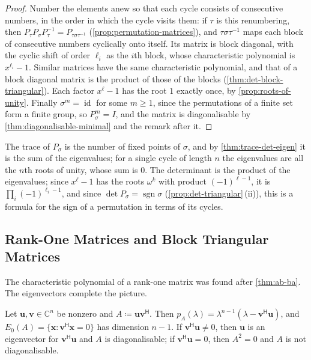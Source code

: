 \begin{proof}
Number the elements anew so that each cycle consists of consecutive numbers, in the order in which the cycle visits them: if $\tau$ is this renumbering, then $P_\tau P_\sigma P_\tau^{-1}=P_{\tau\sigma\tau^{-1}}$ (\cref{prop:permutation-matrices}), and $\tau\sigma\tau^{-1}$ maps each block of consecutive numbers cyclically onto itself. Its matrix is block diagonal, with the cyclic shift of order $\ell_i$ as the $i$th block, whose characteristic polynomial is $x^{\ell_i}-1$. Similar matrices have the same characteristic polynomial, and that of a block diagonal matrix is the product of those of the blocks (\cref{thm:det-block-triangular}). Each factor $x^{\ell}-1$ has the root $1$ exactly once, by \cref{prop:roots-of-unity}. Finally $\sigma^m=\operatorname{id}$ for some $m\ge1$, since the permutations of a finite set form a finite group, so $P_\sigma^m=I$, and the matrix is diagonalisable by \cref{thm:diagonalisable-minimal} and the remark after it.
\end{proof}

The trace of $P_\sigma$ is the number of fixed points of $\sigma$, and by \cref{thm:trace-det-eigen} it is the sum of the eigenvalues; for a single cycle of length $n$ the eigenvalues are all the $n$th roots of unity, whose sum is $0$. The determinant is the product of the eigenvalues; since $x^\ell-1$ has the roots $\omega^k$ with product $(-1)^{\ell-1}$, it is $\prod_i(-1)^{\ell_i-1}$, and since $\det P_\sigma=\operatorname{sgn}\sigma$ (\cref{prop:det-triangular}\,(ii)), this is a formula for the sign of a permutation in terms of its cycles.

\subsection{Rank-One Matrices and Block Triangular Matrices}

The characteristic polynomial of a rank-one matrix was found after \cref{thm:ab-ba}. The eigenvectors complete the picture.

\begin{proposition}
\label{prop:rank-one-eigen}
Let $\mathbf u,\mathbf v\in\mathbb C^n$ be nonzero and $A\coloneqq\mathbf u\mathbf v^{\mathsf H}$. Then $p_A(\lambda)=\lambda^{n-1}(\lambda-\mathbf v^{\mathsf H}\mathbf u)$, and $E_0(A)=\{\mathbf x:\mathbf v^{\mathsf H}\mathbf x=0\}$ has dimension $n-1$. If $\mathbf v^{\mathsf H}\mathbf u\ne0$, then $\mathbf u$ is an eigenvector for $\mathbf v^{\mathsf H}\mathbf u$ and $A$ is diagonalisable; if $\mathbf v^{\mathsf H}\mathbf u=0$, then $A^2=0$ and $A$ is not diagonalisable.
\end{proposition}

